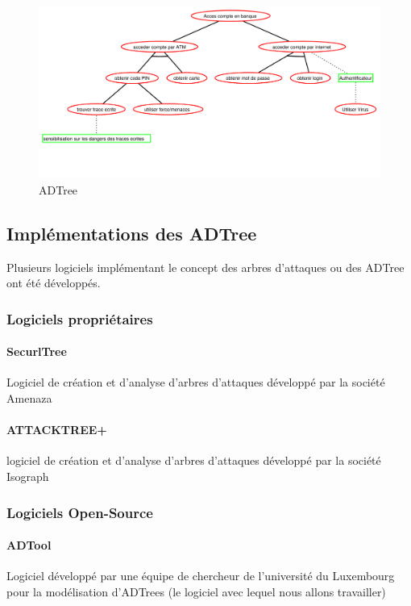         \begin{figure}
            \begin{center}
                \includegraphics[width=1\textwidth]{figure/exemple2_rapport.pdf}
            \end{center}
            \caption{ADTree}
            \label{fig:arbre_exemple_2}
        \end{figure}

	\subsection{Implémentations des ADTree}
		Plusieurs logiciels implémentant le concept des arbres d'attaques ou des ADTree ont été développés.
        
        \subsubsection{Logiciels propriétaires}
            \paragraph{SecurlTree} Logiciel de création et d'analyse d'arbres d'attaques développé par la société Amenaza

            \paragraph{ATTACKTREE+} logiciel de création et d'analyse d'arbres d'attaques développé par la société Isograph
        
        \subsubsection{Logiciels Open-Source}
            \paragraph{ADTool} Logiciel développé par une équipe de chercheur de l'université du Luxembourg pour la modélisation d'ADTrees (le logiciel avec lequel nous allons travailler)

